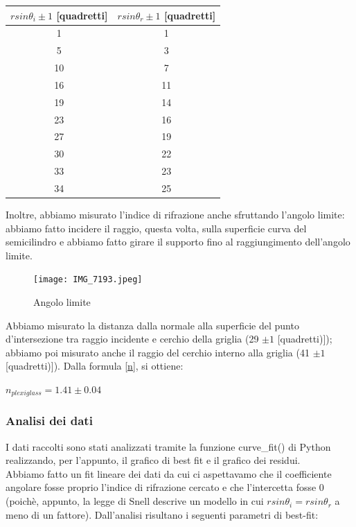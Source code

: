 \documentclass{article}
\begin{document}
\begin{center}
    \begin{tabular}{c|c}
    \toprule
        $r sin \theta_i \pm 1$ [quadretti] & $r sin \theta_r \pm 1$ [quadretti]  \\
     \midrule
        1 & 1\\
    \midrule
    5 & 3\\
    \midrule
    10 & 7\\
    \midrule
    16 & 11\\
    \midrule
    19 & 14\\
    \midrule
    23 & 16\\
    \midrule
    27 & 19\\
    \midrule
    30 & 22\\
    \midrule
    33 & 23\\
    \midrule
    34 & 25\\
    \bottomrule
    \end{tabular}
\end{center}
Inoltre, abbiamo misurato l'indice di rifrazione anche sfruttando l'angolo limite: abbiamo fatto incidere il raggio, questa volta, sulla superficie curva del semicilindro e abbiamo fatto girare il supporto fino al raggiungimento dell'angolo limite.

\begin{figure} [H]
    \centering
    \texttt{[image: IMG\_7193.jpeg]}
    \caption{Angolo limite}
    \label{fig:my_label}
\end{figure}

Abbiamo misurato la distanza dalla normale alla superficie del punto d'intersezione tra raggio incidente e cerchio della griglia (29 $\pm 1$ [quadretti)]); abbiamo poi misurato anche il raggio del cerchio interno alla griglia (41 $\pm 1$ [quadretti)]). Dalla formula \eqref{n}, si ottiene:

\begin{center}   
$n_{plexiglass} = 1.41 \pm 0.04$
\end{center}

\vspace{1em}

\subsubsection{Analisi dei dati} %
I dati raccolti sono stati analizzati tramite la funzione curve\_fit() di Python realizzando, per l'appunto, il grafico di best fit  e il grafico dei residui.\\
Abbiamo fatto un fit lineare dei dati da cui ci aspettavamo che il coefficiente angolare fosse proprio l'indice di rifrazione cercato e che l'intercetta fosse 0 (poichè, appunto, la legge di Snell descrive un modello in cui $rsin\theta_i = rsin\theta_r$ a meno di un fattore). Dall'analisi risultano i seguenti parametri di best-fit:
\end{document}
